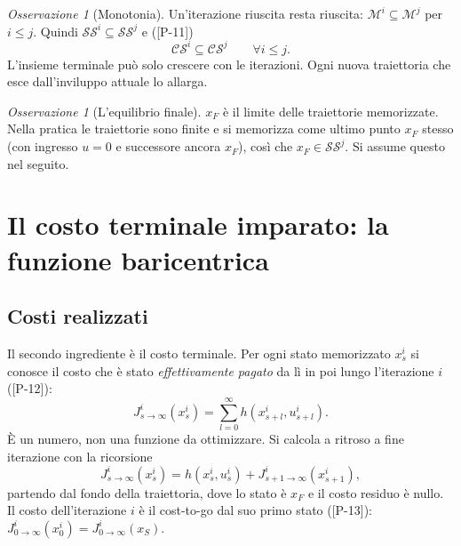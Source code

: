 \documentclass[11pt,a4paper]{article}
\theoremstyle{definition}
\theoremstyle{plain}
\theoremstyle{remark}
\newtheorem{osservazione}[definizione]{Osservazione}
\newcommand{\SSet}{\mathcal{SS}}
\newcommand{\CS}{\mathcal{CS}}
\newcommand{\Mc}{\mathcal{M}}
\newcommand{\eqp}[1]{\textup{[P-#1]}}   %
\begin{document}
\begin{osservazione}[Monotonia]
Un'iterazione riuscita resta riuscita: $\Mc^i\subseteq\Mc^j$ per $i\le j$.
Quindi $\SSet^i\subseteq\SSet^j$ e (\eqp{11})
\begin{equation}\label{eq:CS-monotono}
  \CS^i\subseteq\CS^j\qquad\forall i\le j.
\end{equation}
L'insieme terminale può solo crescere con le iterazioni. Ogni nuova
traiettoria che esce dall'inviluppo attuale lo allarga.
\end{osservazione}

\begin{osservazione}[L'equilibrio finale]
$x_F$ è il limite delle traiettorie memorizzate. Nella pratica le
traiettorie sono finite e si memorizza come ultimo punto $x_F$ stesso (con
ingresso $u=0$ e successore ancora $x_F$), così che $x_F\in\SSet^j$. Si
assume questo nel seguito.
\end{osservazione}

\section{Il costo terminale imparato: la funzione baricentrica}\label{sec:costo-terminale}

\subsection{Costi realizzati}

Il secondo ingrediente è il costo terminale. Per ogni stato memorizzato
$x^i_s$ si conosce il costo che è stato \emph{effettivamente pagato} da lì in
poi lungo l'iterazione $i$ (\eqp{12}):
\begin{equation}\label{eq:cost-to-go}
  J^i_{s\to\infty}(x^i_s) = \sum_{l=0}^{\infty} h(x^i_{s+l},u^i_{s+l}).
\end{equation}
È un numero, non una funzione da ottimizzare. Si calcola a ritroso a fine
iterazione con la ricorsione
\begin{equation}\label{eq:ricorsione-costi}
  J^i_{s\to\infty}(x^i_s) = h(x^i_s,u^i_s) + J^i_{s+1\to\infty}(x^i_{s+1}),
\end{equation}
partendo dal fondo della traiettoria, dove lo stato è $x_F$ e il costo
residuo è nullo. Il costo dell'iterazione $i$ è il cost-to-go dal suo primo
stato (\eqp{13}): $J^i_{0\to\infty}(x^i_0)=J^i_{0\to\infty}(x_S)$.
\end{document}
